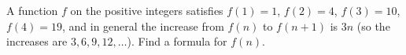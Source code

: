 A function $f$ on the positive integers satisfies $f(1)=1$, $f(2)=4$, $f(3)=10$, $f(4)=19$, and in general the increase from $f(n)$ to $f(n+1)$ is $3n$ (so the increases are $3,6,9,12,\dots$). Find a formula for $f(n)$.
